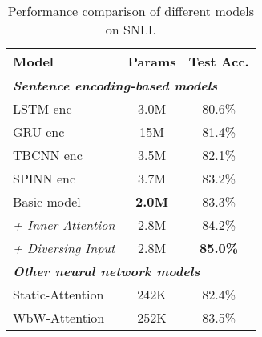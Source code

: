 \documentclass[11pt,letterpaper]{article}
\begin{document}
\begin{table}[]
\centering
\begin{tabular}{|l|c|c|}
\hline
\textbf{Model}             & \multicolumn{1}{l|}{\textbf{Params}} & \multicolumn{1}{l|}{\textbf{Test Acc.}} \\ \hline
\multicolumn{3}{|l|}{\textit{\textbf{Sentence encoding-based models}}}                                      \\ \hline
LSTM enc                   & 3.0M                                 & 80.6\%                                  \\ \hline
GRU enc                    & 15M                                  & 81.4\%                                  \\ \hline
TBCNN enc                  & 3.5M                                 & 82.1\%                                  \\ \hline
SPINN enc                  & 3.7M                                 & 83.2\%                                  \\ \hline
Basic model                & \textbf{2.0M}                        & 83.3\%                                  \\
\textit{+ Inner-Attention} & 2.8M                                 & 84.2\%                                  \\
\textit{+ Diversing Input} & 2.8M                                 & \textbf{85.0\%}                         \\ \hline
\multicolumn{3}{|l|}{\textit{\textbf{Other neural network models}}}                                         \\ \hline
Static-Attention           & 242K                                 & 82.4\%                                  \\ \hline
WbW-Attention              & 252K                                 & 83.5\%                                  \\ \hline
\end{tabular}
\caption{Performance comparison of different models on SNLI.}
\label{ComPerf}
\end{table}
\end{document}
